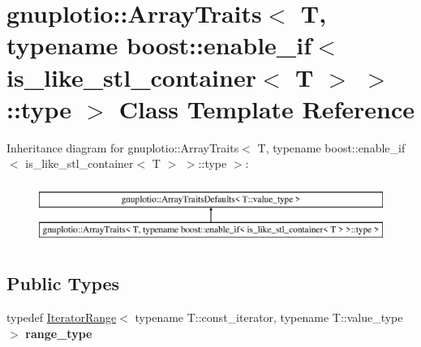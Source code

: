 \hypertarget{classgnuplotio_1_1ArrayTraits_3_01T_00_01typename_01boost_1_1enable__if_3_01is__like__stl__conta99f8c9e80e271bc1ed047cdd05794af4}{}\section{gnuplotio\+:\+:Array\+Traits$<$ T, typename boost\+:\+:enable\+\_\+if$<$ is\+\_\+like\+\_\+stl\+\_\+container$<$ T $>$ $>$\+:\+:type $>$ Class Template Reference}
\label{classgnuplotio_1_1ArrayTraits_3_01T_00_01typename_01boost_1_1enable__if_3_01is__like__stl__conta99f8c9e80e271bc1ed047cdd05794af4}
Inheritance diagram for gnuplotio\+:\+:Array\+Traits$<$ T, typename boost\+:\+:enable\+\_\+if$<$ is\+\_\+like\+\_\+stl\+\_\+container$<$ T $>$ $>$\+:\+:type $>$\+:\begin{figure}[H]
\begin{center}
\leavevmode
\includegraphics[height=2.000000cm]{classgnuplotio_1_1ArrayTraits_3_01T_00_01typename_01boost_1_1enable__if_3_01is__like__stl__conta99f8c9e80e271bc1ed047cdd05794af4}
\end{center}
\end{figure}
\subsection*{Public Types}
\begin{DoxyCompactItemize}
\item 
\mbox{\label{classgnuplotio_1_1ArrayTraits_3_01T_00_01typename_01boost_1_1enable__if_3_01is__like__stl__conta99f8c9e80e271bc1ed047cdd05794af4_ab702072abbe018bbc90b9967ca8c4b42}} 
typedef \mbox{\hyperlink{classgnuplotio_1_1IteratorRange}{Iterator\+Range}}$<$ typename T\+::const\+\_\+iterator, typename T\+::value\+\_\+type $>$ {\bfseries range\+\_\+type}
\end{DoxyCompactItemize}

